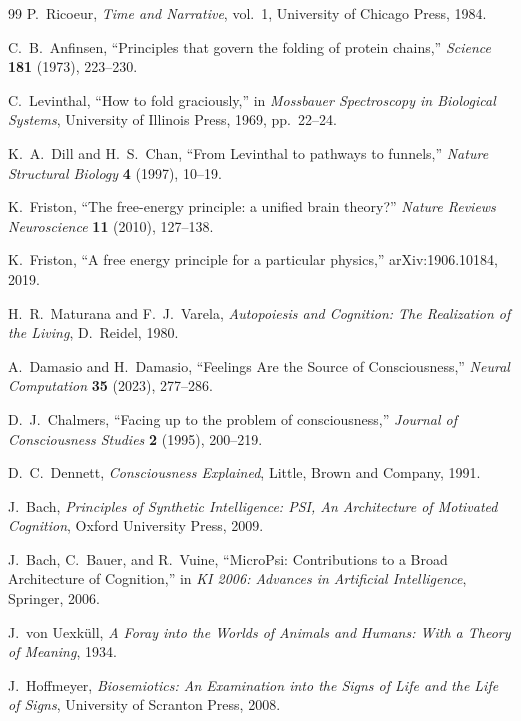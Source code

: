 \documentclass[11pt]{article}
\theoremstyle{remark}
\theoremstyle{plain}
\begin{document}
\begin{thebibliography}{99}
P.\ Ricoeur,
\emph{Time and Narrative}, vol.\ 1,
University of Chicago Press, 1984.

C.\ B.\ Anfinsen,
``Principles that govern the folding of protein chains,''
\emph{Science} \textbf{181} (1973), 223--230.

C.\ Levinthal,
``How to fold graciously,''
in \emph{Mossbauer Spectroscopy in Biological Systems},
University of Illinois Press, 1969, pp.\ 22--24.

K.\ A.\ Dill and H.\ S.\ Chan,
``From Levinthal to pathways to funnels,''
\emph{Nature Structural Biology} \textbf{4} (1997), 10--19.

K.\ Friston,
``The free-energy principle: a unified brain theory?''
\emph{Nature Reviews Neuroscience} \textbf{11} (2010), 127--138.

K.\ Friston,
``A free energy principle for a particular physics,''
arXiv:1906.10184, 2019.

H.\ R.\ Maturana and F.\ J.\ Varela,
\emph{Autopoiesis and Cognition: The Realization of the Living},
D.\ Reidel, 1980.

A.\ Damasio and H.\ Damasio,
``Feelings Are the Source of Consciousness,''
\emph{Neural Computation} \textbf{35} (2023), 277--286.

D.\ J.\ Chalmers,
``Facing up to the problem of consciousness,''
\emph{Journal of Consciousness Studies} \textbf{2} (1995), 200--219.

D.\ C.\ Dennett,
\emph{Consciousness Explained},
Little, Brown and Company, 1991.

J.\ Bach,
\emph{Principles of Synthetic Intelligence: PSI, An Architecture of Motivated Cognition},
Oxford University Press, 2009.

J.\ Bach, C.\ Bauer, and R.\ Vuine,
``MicroPsi: Contributions to a Broad Architecture of Cognition,''
in \emph{KI 2006: Advances in Artificial Intelligence},
Springer, 2006.

J.\ von Uexk\"ull,
\emph{A Foray into the Worlds of Animals and Humans: With a Theory of Meaning},
1934.

J.\ Hoffmeyer,
\emph{Biosemiotics: An Examination into the Signs of Life and the Life of Signs},
University of Scranton Press, 2008.


\end{thebibliography}
\end{document}
